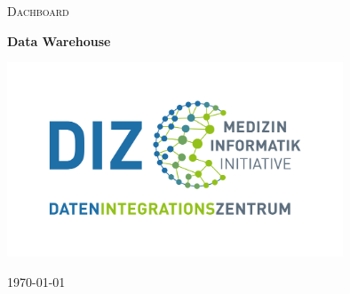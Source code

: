 \begin{titlepage}
	\thispagestyle{firstpage}
	
	\centering
	\vspace*{5cm}
	{\scshape\LARGE Dachboard\par}
	\vspace{1.5cm}
	{\huge \bfseries Data Warehouse\par}
	\vspace{2cm}
    \includegraphics[width=10cm]{figures/diz.jpg}
	\vfill
	
	{\large \today\par}
\end{titlepage}
